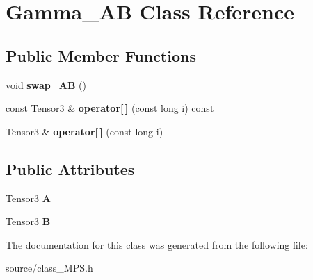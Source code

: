 \hypertarget{class_gamma___a_b}{}\section{Gamma\+\_\+\+AB Class Reference}
\label{class_gamma___a_b}
\subsection*{Public Member Functions}
\begin{DoxyCompactItemize}
\item 
void {\bfseries swap\+\_\+\+AB} ()\hypertarget{class_gamma___a_b_af2489e92c57c46ad36fb3042e8c277a6}{}\label{class_gamma___a_b_af2489e92c57c46ad36fb3042e8c277a6}

\item 
const Tensor3 \& {\bfseries operator\mbox{[}$\,$\mbox{]}} (const long i) const \hypertarget{class_gamma___a_b_a991de2d3e060ce82758ac4501b5475aa}{}\label{class_gamma___a_b_a991de2d3e060ce82758ac4501b5475aa}

\item 
Tensor3 \& {\bfseries operator\mbox{[}$\,$\mbox{]}} (const long i)\hypertarget{class_gamma___a_b_a125177a70b9e18e80f45bc685c921374}{}\label{class_gamma___a_b_a125177a70b9e18e80f45bc685c921374}

\end{DoxyCompactItemize}
\subsection*{Public Attributes}
\begin{DoxyCompactItemize}
\item 
Tensor3 {\bfseries A}\hypertarget{class_gamma___a_b_ae16402500599e0479396a5203e5f8581}{}\label{class_gamma___a_b_ae16402500599e0479396a5203e5f8581}

\item 
Tensor3 {\bfseries B}\hypertarget{class_gamma___a_b_aad455ba9e8cc5a4abac2e47195e229a4}{}\label{class_gamma___a_b_aad455ba9e8cc5a4abac2e47195e229a4}

\end{DoxyCompactItemize}


The documentation for this class was generated from the following file\+:\begin{DoxyCompactItemize}
\item 
source/class\+\_\+\+M\+P\+S.\+h\end{DoxyCompactItemize}
